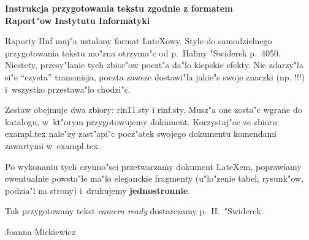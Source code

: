 
\textheight=220mm
\textwidth=170mm
\topmargin=-15mm
\oddsidemargin=0mm
\pagestyle{empty}
\parindent=20pt
\parskip=20pt

\def\leadersfill{\leaders\hbox to 4pt{\hss.\hss}\hfill}


\thispagestyle{empty}

\begin{center}
{\bf Instrukcja przygotowania tekstu zgodnie z formatem\\
 Raport"ow Instytutu Informatyki}
\end{center}

\bigskip

Raporty IInf maj"a ustalony format LateXowy. Style do samodzielnego
przygotowania tekstu mo"zna otrzyma"c od p.~Haliny "Swiderek p.~4050.
Niestety, przesy"lanie tych zbior"ow poczt"a da"lo kiepskie efekty.
Nie zdarzy"la si"e ``czysta'' transmisja, poczta zawsze dostawi"la jakie"s
swoje znaczki (np. !!!) i~wszystko przestawa"lo chodzi"c.

Zestaw obejmuje dwa zbiory: rin11.sty i rinf.sty. Musz"a one zosta"c
wgrane do katalogu, w~kt"orym przygotowujemy dokument. 
Korzystaj"ac ze zbioru exampl.tex nale"zy zast"api"c po\-cz"a\-tek swojego
dokumentu komendami zawartymi w~exampl.tex.

Po wykonaniu tych czynno"sci przetwarzamy dokument LateXem, poprawiamy
ewentualnie powsta"le ma"lo eleganckie fragmenty (u"lo"zenie tabel,
rysunk"ow, podzia"l na strony) i~drukujemy {\bf jednostronnie}.

Tak przygotowany tekst {\it camera ready\/} dostarczamy p.~H.~"Swiderek.

\begin{flushright}
 Joanna Mickiewicz
\end{flushright}




